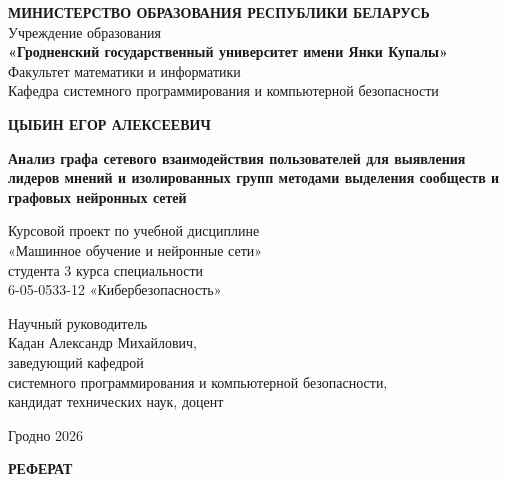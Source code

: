\documentclass[14pt,a4paper]{extarticle}
\begin{document}
\thispagestyle{empty}
\begin{center}
\textbf{МИНИСТЕРСТВО ОБРАЗОВАНИЯ РЕСПУБЛИКИ БЕЛАРУСЬ}\\[2pt]
Учреждение образования\\
\textbf{«Гродненский государственный университет имени Янки Купалы»}\\[2pt]
Факультет математики и информатики\\
Кафедра системного программирования и компьютерной безопасности

\vspace{3cm}

\textbf{ЦЫБИН ЕГОР АЛЕКСЕЕВИЧ}

\vspace{1.2cm}

\textbf{Анализ графа сетевого взаимодействия пользователей для выявления лидеров мнений и изолированных групп методами выделения сообществ и графовых нейронных сетей}

\vspace{1.2cm}

Курсовой проект по учебной дисциплине\\
«Машинное обучение и нейронные сети»\\
студента 3 курса специальности\\
6-05-0533-12 «Кибербезопасность»
\end{center}

\vspace{2.5cm}
\begin{flushright}
\begin{minipage}{0.55\textwidth}
Научный руководитель\\
Кадан Александр Михайлович,\\
заведующий кафедрой\\
системного программирования и компьютерной безопасности,\\
кандидат технических наук, доцент
\end{minipage}
\end{flushright}

\vfill
\begin{center}
Гродно 2026
\end{center}

\newpage
\setcounter{page}{2}
\begin{center}\textbf{РЕФЕРАТ}\end{center}
\vspace{6pt}
\end{document}
